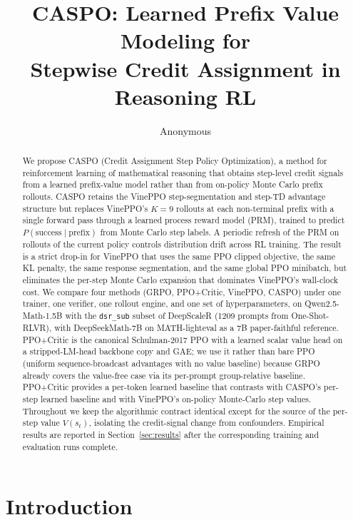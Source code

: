 \documentclass[11pt]{article}
\title{CASPO: Learned Prefix Value Modeling for\\
       Stepwise Credit Assignment in Reasoning RL}
\author{Anonymous}
\date{}
\newcommand{\caspo}{\textsc{CASPO}}
\newcommand{\ppo}{PPO}
\newcommand{\ppocritic}{PPO+Critic}
\newcommand{\grpo}{GRPO}
\newcommand{\vineppo}{VinePPO}
\begin{document}
\maketitle

\begin{abstract}
We propose \caspo{} (Credit Assignment Step Policy Optimization), a method for
reinforcement learning of mathematical reasoning that obtains step-level
credit signals from a learned prefix-value model rather than from on-policy
Monte Carlo prefix rollouts. \caspo{} retains the \vineppo{} step-segmentation
and step-TD advantage structure but replaces \vineppo{}'s $K{=}9$ rollouts at
each non-terminal prefix with a single forward pass through a learned
process reward model (PRM), trained to predict
$P(\text{success} \mid \text{prefix})$ from Monte Carlo step labels.
A periodic refresh of the PRM on rollouts of the current policy controls
distribution drift across RL training. The result is a strict drop-in for
\vineppo{} that uses the same PPO clipped objective, the same KL penalty,
the same response segmentation, and the same global PPO minibatch, but
eliminates the per-step Monte Carlo expansion that dominates \vineppo{}'s
wall-clock cost. We compare four methods (\grpo{}, \ppocritic{},
\vineppo{}, \caspo{}) under one trainer, one verifier, one rollout engine,
and one set of hyperparameters, on Qwen2.5-Math-1.5B with the
\texttt{dsr\_sub} subset of DeepScaleR (1209 prompts from One-Shot-RLVR),
with DeepSeekMath-7B on MATH-lighteval as a 7B paper-faithful reference. \ppocritic{} is the
canonical Schulman-2017 \ppo{} with a learned scalar value head on a
stripped-LM-head backbone copy and GAE; we use it rather than bare \ppo{}
(uniform sequence-broadcast advantages with no value baseline) because
\grpo{} already covers the value-free case via its per-prompt
group-relative baseline. \ppocritic{} provides a per-token learned baseline
that contrasts with \caspo{}'s per-step learned baseline and with
\vineppo{}'s on-policy Monte-Carlo step values. Throughout we keep the
algorithmic contract identical except for the source of the per-step value
$V(s_t)$, isolating the credit-signal change from confounders. Empirical
results are reported in Section~\ref{sec:results} after the corresponding
training and evaluation runs complete.
\end{abstract}

\section{Introduction}
\label{sec:intro}
\end{document}
